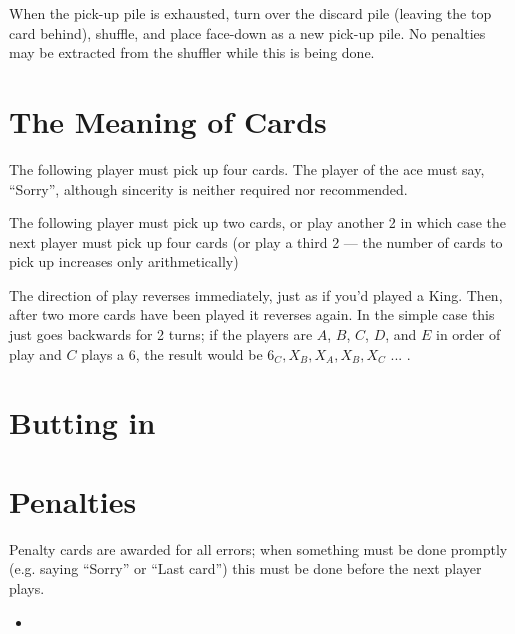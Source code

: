 \documentclass[12pt]{article}
\begin{document}
When the pick-up pile is exhausted, turn over the discard pile (leaving the top card behind),
shuffle, and place face-down as a new pick-up pile.  No penalties may be extracted from the
shuffler while this is being done.

\section{The Meaning of Cards}
\label{specialCards}

\begin{description}
\newcommand{\card}[1]{\hbox to 7mm{#1\hfil}}
\item[\card{Ace}]
  The following player must pick up four cards.  The player of the ace must say, ``Sorry'', although sincerity is neither required nor recommended.

  \item[\card{2}]
    The following player must pick up two cards, or play another 2 in which case the next player must
    pick up four cards (or play a third 2 --- the number of cards to pick up increases only arithmetically)

  \item[\card{6}]
    The direction of play reverses immediately, just as if you'd played a King.  Then, after two
    more cards have been played it reverses again.  In the simple case this just goes backwards
    for 2 turns; if the players are $A$, $B$, $C$, $D$, and $E$ in order of play and $C$ plays
    a 6, the result would be $6_C, X_B, X_A, X_B, X_C$ ... .
    
\end{description}

\section{Butting in}
\label{buttingIn}

\section{Penalties}
\label{penalties}

Penalty cards are awarded for all errors;  when something must be done promptly (e.g. saying ``Sorry'' or
``Last card'') this must be done before the next player plays.

\begin{itemize}
  \item 
\end{itemize}
\end{document}
